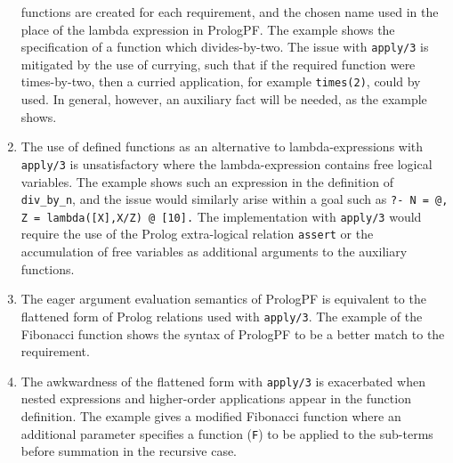 \begin{enumerate}
{  functions are created for each requirement, and the chosen name used in the place
  of the lambda expression in PrologPF.  The example shows the specification of
  a function which divides-by-two.  The issue with \texttt{apply/3} is mitigated by
  the use of currying, such that if the required function were times-by-two, then
  a curried application, for example \texttt{times(2)}, could by used.
  In general, however,
  an auxiliary fact will be needed, as the example shows.}
\item{The use of defined functions as an alternative to lambda-expressions with
  \texttt{apply/3} is unsatisfactory where the lambda-expression contains free
  logical
  variables.  The example shows such an expression in the definition of
  \texttt{div\_{}by\_{}n}, and the issue would similarly arise within a goal
  such as \texttt{?- N = @, Z = lambda([X],X/Z) @ [10].}  The implementation with
  \texttt{apply/3} would require the use of the Prolog extra-logical relation
  \texttt{assert} or the accumulation of free variables as additional arguments to
  the auxiliary functions.}
\item{The eager argument evaluation semantics of PrologPF is equivalent to
  the flattened form of Prolog relations used with \texttt{apply/3}.  The
  example of the Fibonacci function shows the syntax of PrologPF to be a better
  match to the requirement.}
\enlargethispage{-2\baselineskip} %
\item{The awkwardness of the flattened form with \texttt{apply/3} is exacerbated
  when nested expressions and higher-order applications appear in the
  function definition.  The example gives a modified Fibonacci function where an
  additional parameter specifies a function (\texttt{F}) to be applied to the
  sub-terms before summation in the recursive case.

}
\end{enumerate}
